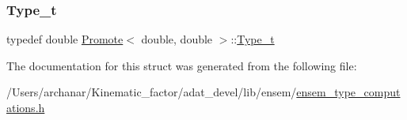 \subsubsection{\texorpdfstring{Type\_t}{Type\_t}\hspace{0.1cm}{\footnotesize\ttfamily [2/2]}}
{\footnotesize\ttfamily typedef double \mbox{\hyperlink{structPromote}{Promote}}$<$ double, double $>$\+::\mbox{\hyperlink{structPromote_3_01double_00_01double_01_4_a1183eb3c61824b2ad80a7c7e7524974a}{Type\+\_\+t}}}



The documentation for this struct was generated from the following file\+:\begin{DoxyCompactItemize}
\item 
/\+Users/archanar/\+Kinematic\+\_\+factor/adat\+\_\+devel/lib/ensem/\mbox{\hyperlink{lib_2ensem_2ensem__type__computations_8h}{ensem\+\_\+type\+\_\+computations.\+h}}\end{DoxyCompactItemize}

